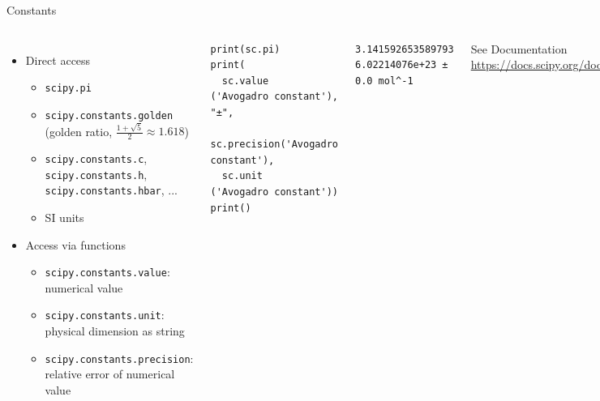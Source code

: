 
\begin{frame}[fragile]{Constants}
%
\vspace{-4pt}
\begin{columns}[T]
\begin{itemize}
\item Direct access
	\begin{itemize}
	\item \texttt{scipy.pi}
	\item \texttt{scipy.constants.golden}\\
	 (golden ratio, $\frac{1 + \sqrt{5}}{2} \approx 1.618$)
	\item \texttt{scipy.constants.c}, \texttt{scipy.constants.h}, \texttt{scipy.constants.hbar}, ...
	\item SI units
	\end{itemize}
\item Access via functions
	\begin{itemize}
	\item \texttt{scipy.constants.value}: numerical value
	\item \texttt{scipy.constants.unit}: physical dimension as string
	\item \texttt{scipy.constants.precision}: relative error of numerical value
	\end{itemize}
\end{itemize}
%
\begin{codebox}
\begin{verbatim}
print(sc.pi)
print(
  sc.value    ('Avogadro constant'), "±",
  sc.precision('Avogadro constant'),
  sc.unit     ('Avogadro constant'))
print()
\end{verbatim}
\end{codebox}
%
\begin{cmdbox}
\begin{verbatim}
3.141592653589793
6.02214076e+23 ± 0.0 mol^-1
\end{verbatim}
\end{cmdbox}
%
See Documentation\\
	\scriptsize \url{https://docs.scipy.org/doc/scipy/reference/constants.html}
\end{columns}
%
\end{frame}


